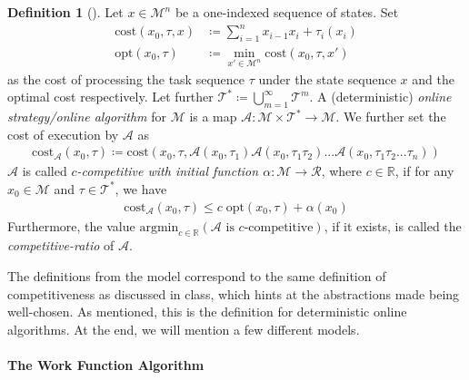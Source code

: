 \documentclass[10pt]{amsart}
\theoremstyle{definition}
\newtheorem{definition}{Definition}
\theoremstyle{remark}
\begin{document}
    \begin{definition}[{\cite[p. 76]{Woeginger}}]
        Let \(x \in \mathcal{M}^n\) be a one-indexed sequence of states. Set
        \begin{align}
            \text{cost}(x_0, \tau, x) &\coloneqq \sum_{i=1}^n x_{i-1}x_i + \tau_i(x_i)\\
            \text{opt}(x_0, \tau) &\coloneqq \min_{x' \in \mathcal{M}^n} \text{cost}(x_0, \tau, x')
        \end{align}
        as the cost of processing the task sequence \(\tau\) under the state sequence \(x\) and the optimal cost respectively. Let further \(\mathcal{T}^* \coloneqq \bigcup_{m=1}^\infty \mathcal{T}^m\). A (deterministic) \emph{online strategy/online algorithm} for \(\mathcal{M}\) is a map \(\mathcal{A}\colon \mathcal{M} \times \mathcal{T}^* \to \mathcal{M}\). We further set the cost of execution by \(\mathcal{A}\) as
        \begin{align}
            \text{cost}_{\mathcal{A}}(x_0, \tau) \coloneqq \text{cost}(x_0, \tau, \mathcal{A}(x_0, \tau_1)\mathcal{A}(x_0, \tau_1\tau_2)...\mathcal{A}(x_0, \tau_1\tau_2...\tau_n))
        \end{align}
        \(\mathcal{A}\) is called \emph{\(c\)-competitive with initial function \(\alpha\colon \mathcal{M} \to \mathcal{R}\)}, where \(c \in \mathbb{R}\), if for any \(x_0 \in \mathcal{M}\) and \(\tau \in \mathcal{T}^*\), we have
        \begin{align}
            \text{cost}_{\mathcal{A}}(x_0, \tau) \leq c \; \text{opt}(x_0, \tau) + \alpha(x_0)
        \end{align}
        Furthermore, the value \(\text{argmin}_{c \in \mathbb{R}} (\mathcal{A} \text{ is } c \text{-competitive})\), if it exists, is called the \emph{competitive-ratio} of \(\mathcal{A}\).
    \end{definition}

    The definitions from the model correspond to the same definition of competitiveness as discussed in class, which hints at the abstractions made being well-chosen. As mentioned, this is the definition for deterministic online algorithms. At the end, we will mention a few different models.

    \phantom{}

    \paragraph{\textbf{The Work Function Algorithm}}
\end{document}
